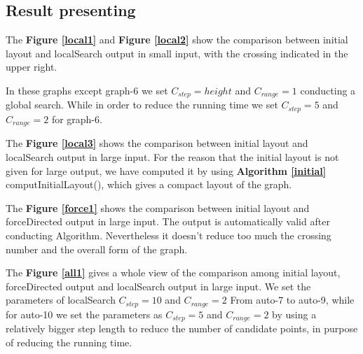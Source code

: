 \documentclass[utf8, a4paper, 12pt]{article}
\begin{document}
\subsection{Result presenting}
The \textbf{Figure \ref{local1}} and \textbf{Figure \ref{local2}} show the comparison between initial layout and localSearch output in small input, with the crossing indicated in the upper right. 

In these graphs except graph-6 we set $C_{step}=height$ and $C_{range}=1$ conducting a global search. While in order to reduce the running time we set $C_{step}=5$ and $C_{range}=2$ for graph-6.

The \textbf{Figure \ref{local3}} shows the comparison between initial layout and localSearch output in large input. For the reason that the initial layout is not given for large output, we have computed it by using \textbf{Algorithm \ref{initial}} computInitialLayout(), which gives a compact layout of the graph.

The \textbf{Figure \ref{force1}} shows the comparison between initial layout and forceDirected output in large input. The output is automatically valid after conducting Algorithm. Nevertheless it doesn't reduce too much the crossing number and the overall form of the graph.
 
The \textbf{Figure \ref{all1}} gives a whole view of the comparison among initial layout, forceDirected output and localSearch output in large input. We set the parameters of localSearch $C_{step}=10$ and $C_{range}=2$ From auto-7 to auto-9, while for auto-10 we set the parameters as $C_{step}=5$ and $C_{range}=2$ by using a relatively bigger step length to reduce the number of candidate points, in purpose of reducing the running time.
\end{document}
